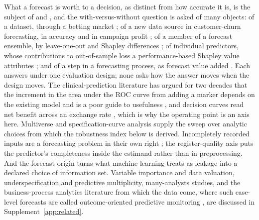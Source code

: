 \documentclass[11pt,3p,review,authoryear]{elsarticle}
\theoremstyle{definition}
\begin{document}
What a forecast is worth to a decision, as distinct from how accurate it is,
is the subject of \citet{murphy1993good} and \citet{granger2000economic}, and
the with-versus-without question is asked of many objects: of a dataset,
through a betting market \citep{maymin2019wage}; of a new data source in
customer-churn forecasting, in accuracy and in campaign profit
\citep{decaigny2020incorporating}; of a member of a forecast ensemble, by
leave-one-out and Shapley differences \citep{kim2026beyond}; of individual
predictors, whose contributions to out-of-sample loss a performance-based
Shapley value attributes \citep{borup2022anatomy}; and of a step in a
forecasting process, as forecast value added \citep{fildes2025forecast}. Each
answers under one evaluation design; none asks how the answer moves when the
design moves. The clinical-prediction literature has argued for two decades
that the increment in the area under the ROC curve from adding a marker
depends on the existing model and is a poor guide to usefulness
\citep{pencina2008evaluating,cook2007roc,kerr2011evaluating}, and decision
curves read net benefit across an exchange rate
\citep{vickers2006dca,vickers2016net}, which is why the operating point is an
axis here. Multiverse and specification-curve analysis
\citep{steegen2016increasing,simonsohn2020specification} supply the sweep over
analytic choices from which the robustness index below is derived.
Incompletely recorded inputs are a forecasting problem in their own right
\citep{wen2024wind}; the register-quality axis puts the predictor's
completeness inside the estimand rather than in preprocessing. And the
forecast origin turns what machine learning treats as leakage
\citep{kaufman2012leakage,kapoor2023leakage} into a declared choice of
information set. Variable importance and data valuation, underspecification
and predictive multiplicity, many-analysts studies, and the business-process
analytics literature from which the data come, where such case-level
forecasts are called outcome-oriented predictive monitoring
\citep{teinemaa2019outcome}, are discussed in Supplement~\ref{app:related}.
\end{document}
